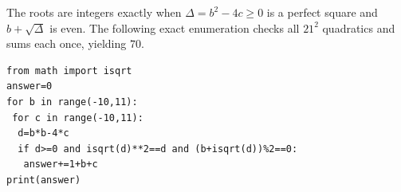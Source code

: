 The roots are integers exactly when $\Delta=b^2-4c\ge0$ is a perfect square and $b+\sqrt\Delta$ is even. The following exact enumeration checks all $21^2$ quadratics and sums each once, yielding $\boxed{70}$.
\begin{verbatim}
from math import isqrt
answer=0
for b in range(-10,11):
 for c in range(-10,11):
  d=b*b-4*c
  if d>=0 and isqrt(d)**2==d and (b+isqrt(d))%2==0:
   answer+=1+b+c
print(answer)
\end{verbatim}
